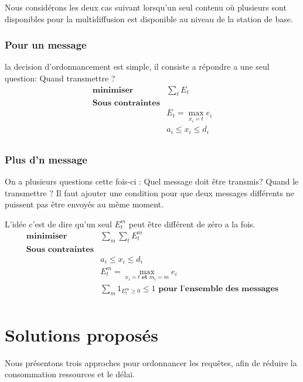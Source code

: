 \documentclass[runningheads]{llncs}
\begin{document}
Nous consid\'erons les deux cas suivant lorsqu'un seul contenu o\`u plusieurs 
sont disponibles pour la multidiffusion est disponible au niveau de la 
station de base.

\subsubsection{Pour un message} la decision d'ordonnancement est simple, il 
consiste a répondre a une seul question: Quand transmettre ?
\[
    \begin{array}{cc}
         \textbf{minimiser} &  \sum\limits_{t} E_t\\
         \textbf{Sous contraintes} & \\
         & E_t = \max\limits_{x_i=t} e_i \\
         & a_i \leq x_i \leq d_i\\
    \end{array}
\] 

\subsubsection{Plus d'n message}
On a plusieurs questions cette fois-ci :
Quel message doit être transmis?  Quand le transmettre ?
Il faut ajouter une condition pour que deux messages différents ne puissent pas être 
envoy\'es au même moment.

L'idée c'est de dire qu'un seul $E_t^m$ peut être différent de zéro a la fois.
\[
    \begin{array}{cc}
         \textbf{minimiser} &  \sum \limits_{m}\sum\limits_{t} E_t^m\\
         \textbf{Sous contraintes} & \\
         & a_i \leq x_i \leq d_i\\
         & E_t^m = \max\limits_{x_i=t \textbf{ et } m_i=m} e_i \\
         & \sum\limits_{m}  1_{ E_t^m\geq 0} \leq 1 \textbf{ pour l'ensemble des messages} \\
    \end{array}
\]

\section{Solutions propos\'es }
Nous présentons trois approches pour ordonnancer les requêtes, afin de 
réduire la consommation ressources et le délai.
\end{document}
